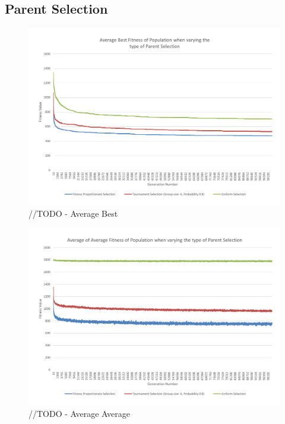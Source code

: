 \subsection{Parent Selection} %
\label{sub:parent_selection}
\begin{figure}
	\centerline{\includegraphics[width=\paperwidth]{figures/CircleTests/CircleTestParentSelectionAverageBest.pdf}}
	\caption{//TODO - Average Best}
\end{figure}

\begin{figure}
	\centerline{\includegraphics[width=\paperwidth]{figures/CircleTests/CircleTestParentSelectionAverageAverage.pdf}}
	\caption{//TODO - Average Average}
\end{figure}

